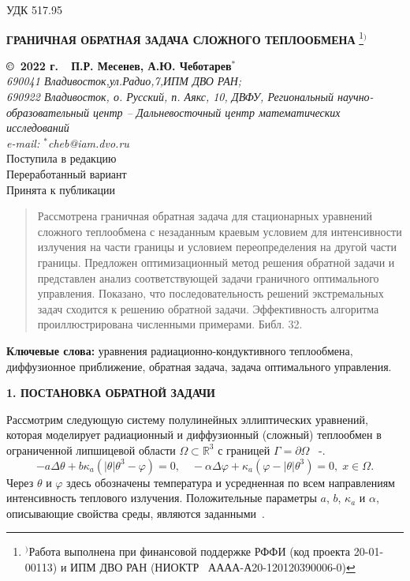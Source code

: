 \documentclass[12pt]{article}
\begin{document}
\def\figurename{Фиг.}
    УДК 517.95
    \begin{center}
    {\bf ГРАНИЧНАЯ ОБРАТНАЯ ЗАДАЧА СЛОЖНОГО ТЕПЛООБМЕНА }
        \footnote[{1}]{$^)$Работа выполнена при финансовой поддержке РФФИ (код проекта 20-01-00113) и ИПМ ДВО РАН (НИОКТР \textnumero~АААА-А20-120120390006-0)}$^)$ 
    \end{center}
    \begin{center}
    {\bf \copyright\  2022 г.\ \  П.Р. Месенев, А.Ю. Чеботарев$^{*}$}
        \\
        {\it 690041 Владивосток,ул.Радио,7,ИПМ ДВО РАН;\\ 690922 Владивосток, о. Русский, п. Аякс, 10, ДВФУ, Региональный научно-образовательный центр -- Дальневосточный центр математических исследований\\
        e-mail:  $^{*}$cheb@iam.dvo.ru}\\
        {\small  Поступила в редакцию \\ Переработанный вариант\\
        Принята к публикации }
    \end{center}

    \sloppy
    \begin{quote}
        \small
        Рассмотрена граничная обратная задача для стационарных уравнений сложного теплообмена с незаданным краевым условием для интенсивности излучения на части границы и условием переопределения на другой части границы.       
        Предложен оптимизационный метод решения обратной задачи и представлен анализ соответствующей задачи
        граничного оптимального управления.
        Показано, что последовательность решений экстремальных задач
        сходится к решению обратной задачи. Эффективность алгоритма проиллюстрирована численными примерами.
        Библ.
        32.
    \end{quote}
    {\bf Ключевые слова:} уравнения радиационно-кондуктивного теплообмена, диффузионное
    приближение, обратная задача, задача оптимального управления.

    \begin{center}
        \textbf{1. ПОСТАНОВКА ОБРАТНОЙ ЗАДАЧИ}
    \end{center}

 Рассмотрим следующую систему полулинейных эллиптических уравнений, которая
 моделирует радиационный и диффузионный (сложный) теплообмен в
    ограниченной липшицевой области $\Omega\subset \mathbb{R}^3$ с границей
    $\Gamma=\partial\Omega$ ~\cite{Pinnau07}-\cite{Kovt14-1}.
    \begin{equation}
        \label{eq1}
        - a\Delta\theta + b\kappa_a(|\theta|\theta^3- \varphi)=0,   \quad
        -\alpha \Delta \varphi + \kappa_a(\varphi-|\theta|\theta^3)=0,\; x\in\Omega.
    \end{equation}
    Через $\theta$ и $\varphi$ здесь обозначены температура и усредненная по всем
    направлениям интенсивность теплового излучения. Положительные параметры
    $a$, $b$, $\kappa_a$ и $\alpha$, описывающие
    свойства среды, являются заданными~\cite{Kovt14-1}.
    
\end{document}
